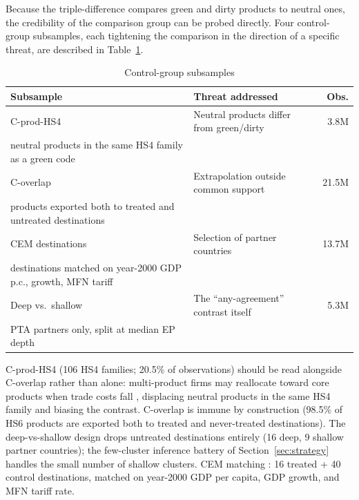\documentclass[12pt]{article}
\begin{document}
Because the triple-difference compares green and dirty products to neutral ones, the
credibility of the comparison group can be probed directly. Four control-group subsamples,
each tightening the comparison in the direction of a specific threat, are described in
Table~\ref{tab:samples}.

\begin{table}[htbp]
\centering
\caption{Control-group subsamples}
\label{tab:samples}
\small
\begin{threeparttable}
\begin{tabular}{llr}
\toprule
Subsample & Threat addressed & Obs. \\
\midrule
C-prod-HS4 & Neutral products differ from green/dirty & 3.8M \\
\quad neutral products in the same HS4 family as a green code & & \\
\addlinespace
C-overlap & Extrapolation outside common support & 21.5M \\
\quad products exported both to treated and untreated destinations & & \\
\addlinespace
CEM destinations & Selection of partner countries & 13.7M \\
\quad destinations matched on year-2000 GDP p.c., growth, MFN tariff & & \\
\addlinespace
Deep vs.\ shallow & The ``any-agreement'' contrast itself & 5.3M \\
\quad PTA partners only, split at median EP depth & & \\
\bottomrule
\end{tabular}
\begin{tablenotes}\footnotesize
\item C-prod-HS4 (106 HS4 families; 20.5\% of observations) should be read alongside C-overlap rather than alone: multi-product firms may reallocate toward core products when trade costs fall \citep{eckel2010}, displacing neutral products in the same HS4 family and biasing the contrast. C-overlap is immune by construction (98.5\% of HS6 products are exported both to treated and never-treated destinations). The deep-vs-shallow design drops untreated destinations entirely (16 deep, 9 shallow partner countries); the few-cluster inference battery of Section~\ref{sec:strategy} handles the small number of shallow clusters. CEM matching \citep{iacus2012}: 16 treated + 40 control destinations, matched on year-2000 GDP per capita, GDP growth, and MFN tariff rate.
\end{tablenotes}
\end{threeparttable}
\end{table}
\end{document}
